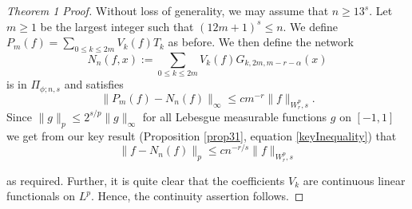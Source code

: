 \documentclass[11pt,a4paper]{article}
\theoremstyle{plain}
\theoremstyle{definition}
\theoremstyle{remark}
\numberwithin{equation}{section}
\begin{document}
\begin{proof}[Theorem 1 Proof]

Without loss of generality, we may assume that \( n \geq 13^s \). Let \( m \geq 1 \) be the largest integer such that \( (12m + 1)^s \leq n \). We define \( P_m(f) = \sum_{0 \leq k \leq 2m} V_k(f)T_k \) as before. We then define the network
\begin{equation}
    N_n(f, x) := \sum_{0 \leq k \leq 2m} V_k(f)G_{k,2m,m-r-\alpha}(x)
\end{equation}
is in \( \Pi_{\phi;n,s} \) and satisfies
\begin{equation}
    \| P_m(f) - N_n(f) \|_{\infty} \leq cm^{-r} \| f \|_{W_r^p, s}.
\end{equation}
Since \( \| g \|_p \leq 2^{s/p} \| g \|_{\infty} \) for all Lebesgue measurable functions \( g \) on \( [-1,1] \) we get from our key result (Proposition \ref{prop31}, equation \ref{keyInequality}) that
\begin{equation}
    \| f - N_n(f) \|_p \leq cn^{-r/s} \| f \|_{W_r^p, s}
\end{equation}

as required. Further, it is quite clear that the coefficients \( V_k \) are continuous linear functionals on \( L^p \). Hence, the continuity assertion follows.
\end{proof}
\end{document}
